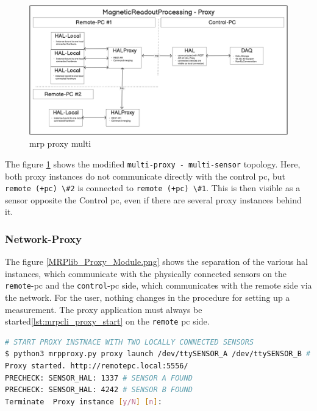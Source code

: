 \begin{figure}
\centering
\includegraphics{./generated_images/border_mrp_proxy_multi.png}
\caption{mrp proxy multi \label{mrp_proxy_multi.png}}
\end{figure}

The figure \ref{mrp_proxy_multi.png} shows the modified
\passthrough{\lstinline!multi-proxy - multi-sensor!} topology. Here,
both proxy instances do not communicate directly with the control
\gls{pc}, but \passthrough{\lstinline!remote (+pc) \#2!} is connected to
\passthrough{\lstinline!remote (+pc) \#1!}. This is then visible as a
sensor opposite the Control \gls{pc}, even if there are several proxy
instances behind it.

\hypertarget{network-proxy}{%
\subsubsection{Network-Proxy}\label{network-proxy}}

The figure \ref{MRPlib_Proxy_Module.png} shows the separation of the
various \gls{hal} instances, which communicate with the physically
connected sensors on the \passthrough{\lstinline!remote!}-\gls{pc} and
the \passthrough{\lstinline!control!}-\gls{pc} side, which communicates
with the remote side via the network. For the user, nothing changes in
the procedure for setting up a measurement. The proxy application must
always be started\ref{lst:mrpcli_proxy_start} on the
\passthrough{\lstinline!remote!} \gls{pc} side.

\begin{lstlisting}[language=bash, caption={MRPproxy usage to enable local sensor usage over network}, label=lst:mrpcli_proxy_start]
# START PROXY INSTNACE WITH TWO LOCALLY CONNECTED SENSORS
$ python3 mrpproxy.py proxy launch /dev/ttySENSOR_A /dev/ttySENSOR_B # add another proxy instance http://proxyinstance_2.local for multi-sensor, multi-proxy chain
Proxy started. http://remotepc.local:5556/
PRECHECK: SENSOR_HAL: 1337 # SENSOR A FOUND
PRECHECK: SENSOR_HAL: 4242 # SENSOR B FOUND
Terminate  Proxy instance [y/N] [n]: 
\end{lstlisting}

